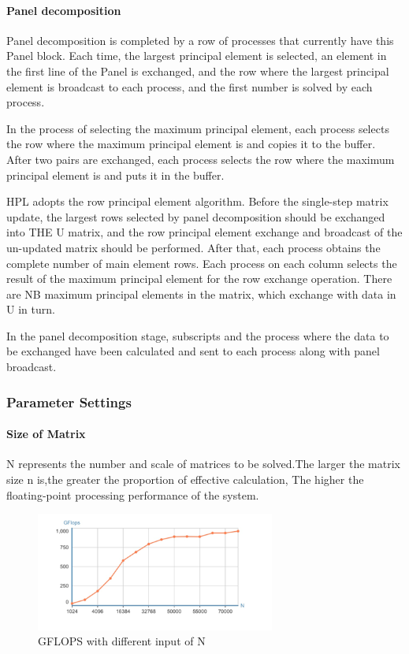 \documentclass[a4paper,12pt]{article}
\begin{document}
\paragraph{Panel decomposition}

Panel decomposition is completed by a row of processes that currently have this Panel block. Each time, the largest principal element is selected, an element in the first line of the Panel is exchanged, and the row where the largest principal element is broadcast to each process, and the first number is solved by each process.

In the process of selecting the maximum principal element, each process selects the row where the maximum principal element is and copies it to the buffer. After two pairs are exchanged, each process selects the row where the maximum principal element is and puts it in the buffer.

HPL adopts the row principal element algorithm. Before the single-step matrix update, the largest rows selected by panel decomposition should be exchanged into THE U matrix, and the row principal element exchange and broadcast of the un-updated matrix should be performed. After that, each process obtains the complete number of main element rows. Each process on each column selects the result of the maximum principal element for the row exchange operation. There are NB maximum principal elements in the matrix, which exchange with data in U in turn.

In the panel decomposition stage, subscripts and the process where the data to be exchanged have been calculated and sent to each process along with panel broadcast.

\subsubsection{Parameter Settings}

\paragraph{Size of Matrix}

N represents the number and scale of matrices to be solved.The larger the matrix size n is,the greater the proportion of effective calculation, The higher the floating-point processing performance of the system.

\begin{figure}[H]
    \centering
    \includegraphics[width=0.7\textwidth]{GFLOPS_N.png}
    \caption{GFLOPS with different input of N}
    \label{fig:gflops_n}
\end{figure}
\end{document}
